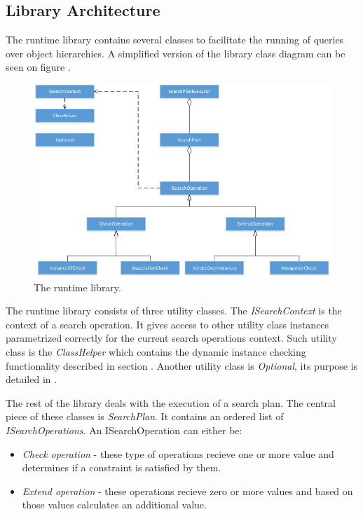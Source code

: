 \subsection{Library Architecture}\label{sect:Runtime_library}

The runtime library contains several classes to facilitate the running of
queries over \CPP{} object hierarchies. A simplified version of the library
class diagram can be seen on figure .

\begin{figure}[!ht]
\centering
\includegraphics[width=150mm, keepaspectratio]{figures/runtime_diagram.png}
\caption{The runtime library.}
\label{fig:runtime}
\end{figure}

The runtime library consists of three utility classes. The \emph{ISearchContext}
is the context of a search operation. It gives access to other utility class
instances parametrized correctly for the current search operations context. Such
utility class is the \emph{ClassHelper} which contains the dynamic instance
checking functionality described in section . Another
utility class is \emph{Optional}, its purpose is detailed in
.

The rest of the library deals with the execution of a search plan. The central
piece of these classes is \emph{SearchPlan}. It contains an ordered list of
\emph{ISearchOperations}. An ISearchOperation can either be:

\begin{itemize}
  \item \emph{Check operation} - these type of operations recieve one or more
  value and determines if a constraint is satisfied by them.
  \item \emph{Extend operation} - these operations recieve zero or more values
  and based on those values calculates an additional value.
\end{itemize}

